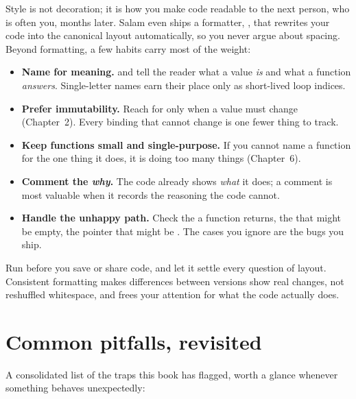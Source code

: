 Style is not decoration; it is how you make code readable to the next person,
who is often you, months later. Salam even ships a formatter, ,
that rewrites your code into the canonical layout automatically, so you never argue
about spacing. Beyond formatting, a few habits carry most of the weight:

\begin{itemize}[leftmargin=1.4em]
  \item \textbf{Name for meaning.}  and  tell the
        reader what a value \emph{is} and what a function \emph{answers}.
        Single-letter names earn their place only as short-lived loop indices.
  \item \textbf{Prefer immutability.} Reach for  only when a value must
        change (Chapter~2). Every binding that cannot change is one fewer thing to
        track.
  \item \textbf{Keep functions small and single-purpose.} If you cannot name a
        function for the one thing it does, it is doing too many things
        (Chapter~6).
  \item \textbf{Comment the \emph{why}.} The code already shows \emph{what} it
        does; a comment is most valuable when it records the reasoning the code
        cannot.
  \item \textbf{Handle the unhappy path.} Check the  a function returns,
        the  that might be empty, the pointer that might be
        . The cases you ignore are the bugs you ship.
\end{itemize}

\begin{tip}
Run  before you save or share code, and let it settle every
question of layout. Consistent formatting makes differences between versions show
real changes, not reshuffled whitespace, and frees your attention for what the code
actually does.
\end{tip}

\section{Common pitfalls, revisited}

A consolidated list of the traps this book has flagged, worth a glance whenever
something behaves unexpectedly:

